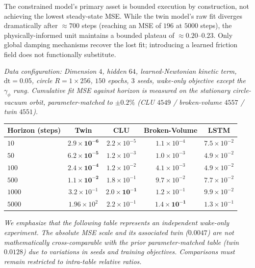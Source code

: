 \documentclass[mlabstract,onecolumn]{jmlr}
\begin{document}
The constrained model's primary asset is bounded execution by construction, not achieving the lowest steady-state MSE. While the twin model's raw fit diverges dramatically after $\approx700$ steps (reaching an MSE of $196$ at $5000$ steps), the physically-informed unit maintains a bounded plateau of $\approx0.20$--$0.23$. Only global damping mechanisms recover the lost fit; introducing a learned friction field does not functionally substitute.

\emph{Data configuration: Dimension $4$, hidden $64$, learned-Newtonian kinetic term, $\mathrm{dt}=0.05$, circle $R=1\times256$, $150$ epochs, $3$ seeds, wake-only objective except the $\gamma_\phi$ rung. Cumulative fit MSE against horizon is measured on the stationary circle-vacuum orbit, parameter-matched to $\pm0.2\%$ (CLU $4549$ / broken-volume $4557$ / twin $4551$).}

\begin{center}
\begin{tabular}{lcccc}
\toprule
Horizon (steps) & \textbf{Twin} & \textbf{CLU} & Broken-Volume & LSTM \\
\midrule
$10$ & $\mathbf{2.9{\times}10^{-6}}$ & $2.2{\times}10^{-5}$ & $1.1{\times}10^{-4}$ & $7.5{\times}10^{-2}$ \\
$50$ & $\mathbf{6.2{\times}10^{-5}}$ & $1.2{\times}10^{-3}$ & $1.0{\times}10^{-3}$ & $4.9{\times}10^{-2}$ \\
$100$ & $\mathbf{2.4{\times}10^{-4}}$ & $1.2{\times}10^{-2}$ & $4.1{\times}10^{-3}$ & $4.9{\times}10^{-2}$ \\
$500$ & $\mathbf{1.1{\times}10^{-2}}$ & $1.8{\times}10^{-1}$ & $9.7{\times}10^{-2}$ & $7.7{\times}10^{-2}$ \\
$1000$ & $3.2{\times}10^{-1}$ & $\mathbf{2.0{\times}10^{-1}}$ & $1.2{\times}10^{-1}$ & $9.9{\times}10^{-2}$ \\
$5000$ & $1.96{\times}10^{2}$ & $2.2{\times}10^{-1}$ & $\mathbf{1.4{\times}10^{-1}}$ & $1.3{\times}10^{-1}$ \\
\bottomrule
\end{tabular}
\end{center}

\emph{We emphasize that the following table represents an independent wake-only experiment. The absolute MSE scale and its associated twin ($0.0047$) are not mathematically cross-comparable with the prior parameter-matched table (twin $0.0128$) due to variations in seeds and training objectives. Comparisons must remain restricted to intra-table relative ratios.}
\end{document}
